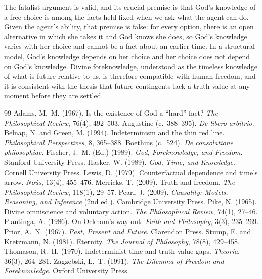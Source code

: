 \documentclass{situationist-preprint}
\begin{document}
The fatalist argument is valid, and its crucial premise is that God's knowledge of a free choice is among the facts held fixed when we ask what the agent can do. Given the agent's ability, that premise is false: for every option, there is an open alternative in which she takes it and God knows she does, so God's knowledge varies with her choice and cannot be a fact about an earlier time. In a structural model, God's knowledge depends on her choice and her choice does not depend on God's knowledge. Divine foreknowledge, understood as the timeless knowledge of what is future relative to us, is therefore compatible with human freedom, and it is consistent with the thesis that future contingents lack a truth value at any moment before they are settled.

\begin{thebibliography}{99}\small
{} Adams, M.~M. (1967). Is the existence of God a \enquote{hard} fact? \emph{The Philosophical Review}, 76(4), 492--503.
 Augustine (c.~388--395). \emph{De libero arbitrio}.
 Belnap, N. and Green, M. (1994). Indeterminism and the thin red line. \emph{Philosophical Perspectives}, 8, 365--388.
 Boethius (c.~524). \emph{De consolatione philosophiae}.
 Fischer, J.~M. (Ed.) (1989). \emph{God, Foreknowledge, and Freedom}. Stanford University Press.
 Hasker, W. (1989). \emph{God, Time, and Knowledge}. Cornell University Press.
 Lewis, D. (1979). Counterfactual dependence and time's arrow. \emph{Noûs}, 13(4), 455--476.
 Merricks, T. (2009). Truth and freedom. \emph{The Philosophical Review}, 118(1), 29--57.
 Pearl, J. (2009). \emph{Causality: Models, Reasoning, and Inference} (2nd ed.). Cambridge University Press.
 Pike, N. (1965). Divine omniscience and voluntary action. \emph{The Philosophical Review}, 74(1), 27--46.
 Plantinga, A. (1986). On Ockham's way out. \emph{Faith and Philosophy}, 3(3), 235--269.
 Prior, A.~N. (1967). \emph{Past, Present and Future}. Clarendon Press.
 Stump, E. and Kretzmann, N. (1981). Eternity. \emph{The Journal of Philosophy}, 78(8), 429--458.
 Thomason, R.~H. (1970). Indeterminist time and truth-value gaps. \emph{Theoria}, 36(3), 264--281.
 Zagzebski, L.~T. (1991). \emph{The Dilemma of Freedom and Foreknowledge}. Oxford University Press.
\end{thebibliography}
\end{document}
